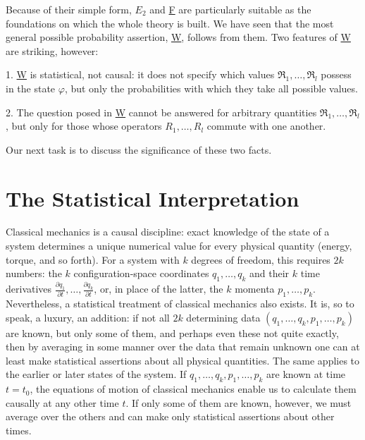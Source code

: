 \documentclass[fontsize=13pt,twoside,openany,headings=normal,parskip=false,bookmarkpackage=false,DIV=calc]{scrbook}
\begin{document}
Because of their simple form, \hyperref[post:III.1.E2]{$E_2$} and \hyperref[post:III.1.F]{F} are particularly suitable as the foundations on which the whole theory is built. We have seen that the most general possible probability assertion, \hyperref[post:III.1.W]{W}, follows from them. Two features of \hyperref[post:III.1.W]{W} are striking, however:

1. \hyperref[post:III.1.W]{W} is statistical, not causal: it does not specify which values $\mathfrak R_1,\ldots,\mathfrak R_l$ possess in the state $\varphi$, but only the probabilities with which they take all possible values.

2. The question posed in \hyperref[post:III.1.W]{W} cannot be answered for arbitrary quantities $\mathfrak R_1,\ldots,\mathfrak R_l$, but only for those whose operators $R_1,\ldots,R_l$ commute with one another.

Our next task is to discuss the significance of these two facts.

\section{The Statistical Interpretation}\label{sec:III.2}
Classical mechanics is a causal discipline: exact knowledge of the state of a system determines a unique numerical value for every physical quantity (energy, torque, and so forth). For a system with $k$ degrees of freedom, this requires $2k$ numbers: the $k$ configuration-space coordinates $q_1,\ldots,q_k$ and their $k$ time derivatives $\frac{\partial q_1}{\partial t},\ldots,\frac{\partial q_k}{\partial t}$, or, in place of the latter, the $k$ momenta $p_1,\ldots,p_k$. Nevertheless, a statistical treatment of classical mechanics also exists. It is, so to speak, a luxury, an addition: if not all $2k$ determining data $(q_1,\ldots,q_k,p_1,\ldots,p_k)$ are known, but only some of them, and perhaps even these not quite exactly, then by averaging in some manner over the data that remain unknown one can at least make statistical assertions about all physical quantities. The same applies to the earlier or
\hypertarget{origpage-108}{}%
later states of the system. If $q_1,\ldots,q_k,p_1,\ldots,p_k$ are known at time $t=t_0$, the equations of motion of classical mechanics enable us to calculate them causally at any other time $t$. If only some of them are known, however, we must average over the others and can make only statistical assertions about other times.
\end{document}
